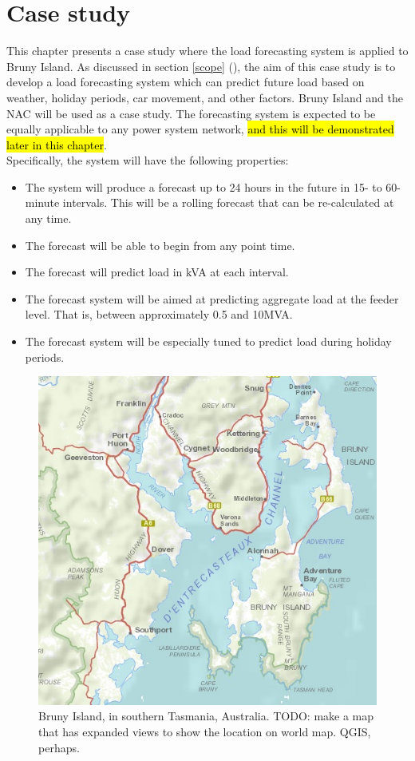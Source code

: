 \chapter{Case study}
This chapter presents a case study where the load forecasting system is applied to Bruny Island.
As discussed in section \ref{scope} (), the aim of this case study is to develop a load forecasting system which can predict future load based on weather, holiday periods, car movement, and other factors. 
Bruny Island and the NAC will be used as a case study. 
The forecasting system is expected to be equally applicable to any power system network, \hl{and this will be demonstrated later in this chapter}.
\\
Specifically, the system will have the following properties:
\begin{itemize}
	\item The system will produce a forecast up to 24 hours in the future in 15- to 60-minute intervals. This will be a rolling forecast that can be re-calculated at any time.
	\item The forecast will be able to begin from any point time.
	\item The forecast will predict load in kVA at each interval.
	\item The forecast system will be aimed at predicting aggregate load at the feeder level. That is, between approximately 0.5 and 10MVA.
	\item The forecast system will be especially tuned to predict load during holiday periods.
\end{itemize}

\begin{figure}
	\centering
	\includegraphics[width=0.35\linewidth]{images/bruny-basic}
	\caption{Bruny Island, in southern Tasmania, Australia. TODO: make a map that has expanded views to show the location on world map. QGIS, perhaps.}
	\label{fig:bruny-basic}
\end{figure}

